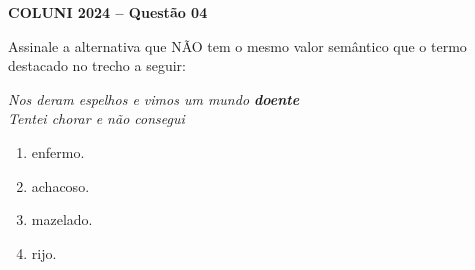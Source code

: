 \textbf{COLUNI 2024 -- Questão 04}\par\medskip Assinale a alternativa que NÃO tem o mesmo valor semântico que o termo destacado no trecho a seguir:

\begin{center}
\textit{Nos deram espelhos e vimos um mundo \textbf{doente}}\\
\textit{Tentei chorar e não consegui}
\end{center}

\begin{enumerate}
\item enfermo.
\item achacoso.
\item mazelado.
\item rijo.
\end{enumerate}
